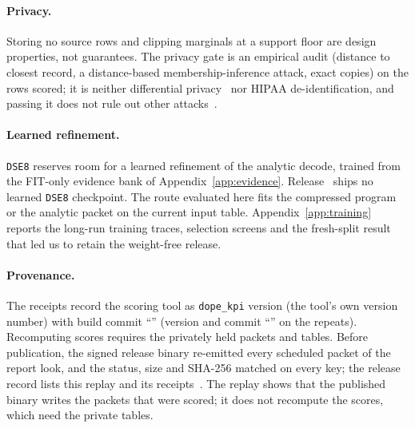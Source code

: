 \paragraph{Privacy.}
Storing no source rows and clipping marginals at a support floor are design properties, not guarantees.
The privacy gate is an empirical audit (distance to closest record, a distance-based membership-inference attack, exact copies) on the rows scored; it is neither differential privacy~\citep{dwork2006calibrating} nor HIPAA de-identification, and passing it does not rule out other attacks~\citep{stadler2022groundhog}.

\paragraph{Learned refinement.}
\texttt{DSE8} reserves room for a learned refinement of the analytic decode, trained from the FIT-only evidence bank of Appendix~\ref{app:evidence}.
Release~ ships no learned \texttt{DSE8} checkpoint. The  route evaluated here fits the compressed program or the analytic packet on the current input table.
Appendix~\ref{app:training} reports the long-run training traces, selection screens and the fresh-split result that led us to retain the weight-free release.

\paragraph{Provenance.}
The receipts record the scoring tool as \texttt{dope\_kpi} version  (the tool's own version number) with build commit ``'' (version  and commit ``'' on the repeats). Recomputing scores requires the privately held packets and tables.
Before publication, the signed release binary re-emitted every scheduled packet of the report look, and the status, size and SHA-256 matched on every key; the release record lists this replay and its receipts~\citep{dope2026v3release}.
The replay shows that the published binary writes the packets that were scored; it does not recompute the scores, which need the private tables.
